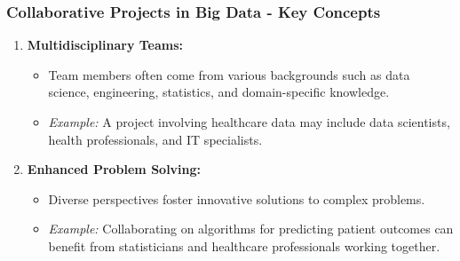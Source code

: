 \documentclass[aspectratio=169]{beamer}
\begin{document}
\begin{frame}[fragile]
    \frametitle{Collaborative Projects in Big Data - Key Concepts}
    \begin{enumerate}
        \item \textbf{Multidisciplinary Teams:}
        \begin{itemize}
            \item Team members often come from various backgrounds such as data science, engineering, statistics, and domain-specific knowledge.
            \item \textit{Example:} A project involving healthcare data may include data scientists, health professionals, and IT specialists.
        \end{itemize}

        \item \textbf{Enhanced Problem Solving:}
        \begin{itemize}
            \item Diverse perspectives foster innovative solutions to complex problems.
            \item \textit{Example:} Collaborating on algorithms for predicting patient outcomes can benefit from statisticians and healthcare professionals working together.
        \end{itemize}
    \end{enumerate}
\end{frame}
\end{document}
